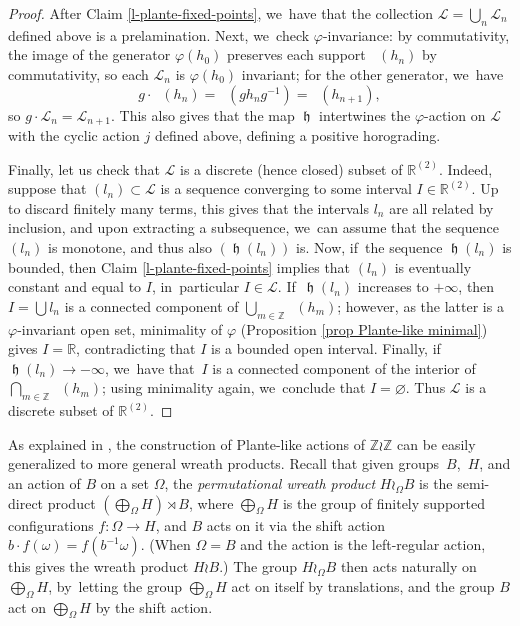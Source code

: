 \documentclass[JEP,XML,SOM,Unicode,NoFloatCountersInSection,published]{cedram}
\theoremstyle{definition}
\DeclareMathOperator{\hor}{\mathfrak{h}}
\DeclareMathOperator{\suppphi}{\mathsf{Supp}^\varphi}
\newcommand{\R}{\mathbb{R}}
\newcommand{\Z}{\mathbb Z}
\newcommand{\Lcal}{\mathcal{L}}
\begin{document}
\begin{proof}
After Claim \ref{l-plante-fixed-points}, we~have that the collection $\Lcal=\bigcup_n \Lcal_n$ defined above is a prelamination. Next, we~check $\varphi$-invariance: by commutativity, the image of the generator $\varphi(h_0)$ preserves each support $\suppphi(h_n)$ by commutativity, so each $\Lcal_n$ is $\varphi(h_0)$ invariant; for the other generator, we~have
\[g\cdot \suppphi(h_n)=\suppphi(gh_ng^{-1})=\suppphi(h_{n+1}),
\]
so $g\cdot \Lcal_n=\Lcal_{n+1}$. This also gives that the map $\hor$ intertwines the $\varphi$-action on $\Lcal$ with the cyclic action $j$ defined above, defining a positive horograding.

Finally, let us check that $\Lcal$ is a discrete (hence closed) subset of $\R^{(2)}$. Indeed, suppose that $(l_n)\subset \Lcal$ is a sequence converging to some interval $I\in \R^{(2)}$. Up to discard finitely many terms, this gives that the intervals $l_n$ are all related by inclusion, and upon extracting a subsequence, we~can assume that the sequence $(l_n)$ is monotone, and thus also $(\hor(l_n))$ is. Now, if~the sequence $\hor(l_n)$ is bounded, then Claim \ref{l-plante-fixed-points} implies that $(l_n)$ is eventually constant and equal to $I$, in~particular $I\in \Lcal$. If~$\hor(l_n)$ increases to $+\infty$, then $I=\bigcup l_n$ is a connected component of $\bigcup_{m\in \Z}\suppphi(h_m)$; however, as the latter is a $\varphi$-invariant open set, minimality of $\varphi$ (Proposition \ref{prop Plante-like minimal}) gives $I=\R$, contradicting that $I$ is a bounded open interval. Finally, if~$\hor(l_n)\to -\infty$, we~have that~$I$ is a connected component of the interior of $\bigcap_{m\in \Z}\suppphi(h_m)$; using minimality again, we~conclude that $I=\varnothing$. Thus $\Lcal$ is a discrete subset of $\R^{(2)}$.
\end{proof}

 \label{s-wreath}
As explained in \cite[Ex.\,8.1.8]{BMRT}, the construction of Plante-like actions of $\Z \wr \Z$ can be easily generalized to more general wreath products. Recall that given groups~$B$,~$H$, and an action of $B$ on a set $\Omega$, the \emph{permutational wreath product} $H\wr_\Omega B$ is the semi-direct product $(\bigoplus_\Omega H)\rtimes B$, where $\bigoplus_\Omega H$ is the group of finitely supported configurations $f\colon \Omega \to H$, and $B$ acts on it via the shift action $b\cdot f(\omega)=f(b^{-1}\omega)$. (When $\Omega=B$ and the action is the left-regular action, this gives the wreath product $H\wr B$.)
The group $H\wr_\Omega B$ then acts naturally on $\bigoplus_\Omega H$, by~letting the group $\bigoplus_{\Omega} H$ act on itself by translations, and the group $B$ act on $\bigoplus_{\Omega} H$ by the shift action.
\end{document}
